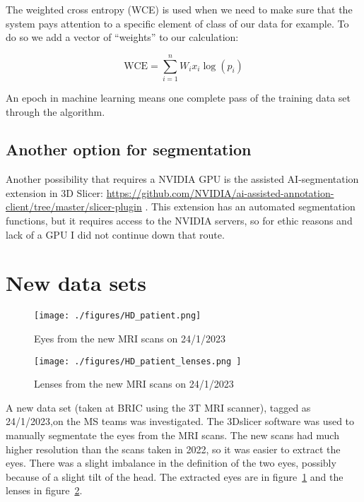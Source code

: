 \documentclass[12pt]{article}
\begin{document}
The weighted cross entropy (WCE) is used when we need to make sure
that the system pays attention to a specific element of class of our
data for example. To do so we add a vector of “weights” to our
calculation:

\begin{equation}
\mbox{WCE} = \sum_{i=1}^{n} W_i x_i \log(p_i)
\end{equation}

An epoch in machine learning means one complete pass of the training
data set through the algorithm.


\subsection{Another option for segmentation}

Another possibility that requires a NVIDIA GPU is the assisted
AI-segmentation extension in 3D Slicer:
\url{https://github.com/NVIDIA/ai-assisted-annotation-client/tree/master/slicer-plugin}
.
This extension has an automated segmentation functions, but it
requires access to the NVIDIA servers, so for ethic reasons and lack
of a GPU I did not continue down that route.


\section{New data sets}

\begin{figure}
\centering
\texttt{[image: ./figures/HD\_patient.png]} 
\caption{Eyes from the new MRI scans on 24/1/2023}
\label{fg:eyeHigh}
\end{figure}


\begin{figure}
\centering
\texttt{[image: ./figures/HD\_patient\_lenses.png ]} 
\caption{Lenses from the new MRI scans on 24/1/2023}
\label{fg:HDlenses}
\end{figure}



A new data set (taken at BRIC using the 3T MRI scanner), tagged as
24/1/2023,on the MS teams was investigated. The 3Dslicer software was
used to manually segmentate the eyes from the MRI scans. The new scans
had much higher resolution than the scans taken in 2022, so it was
easier to extract the eyes. There was a slight imbalance in the
definition of the two eyes, possibly because of a slight tilt of the
head. The extracted eyes are in figure~\ref{fg:eyeHigh} and the lenses
in figure~\ref{fg:HDlenses}.
\end{document}
